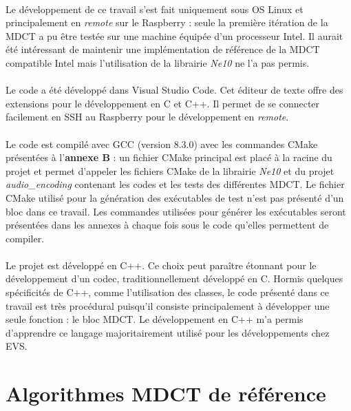 \documentclass{article}
\begin{document}
    \paragraph{}
    Le développement de ce travail s'est fait uniquement sous OS Linux et principalement en \emph{remote} sur le Raspberry : seule la première itération de la MDCT a pu être testée sur une machine équipée d'un processeur Intel. Il aurait été intéressant de maintenir une implémentation de référence de la MDCT compatible Intel mais l'utilisation de la librairie \emph{Ne10} ne l'a pas permis.

    \paragraph{}
    Le code a été développé dans Visual Studio Code. Cet éditeur de texte offre des extensions pour le développement en C et C++. Il permet de se connecter facilement en SSH au Raspberry pour le développement en \emph{remote}.

    \paragraph{}
    Le code est compilé avec GCC (version 8.3.0) avec les commandes CMake présentées à l'\textbf{annexe B} : un fichier CMake principal est placé à la racine du projet et permet d'appeler les fichiers CMake de la librairie \emph{Ne10} et du projet \emph{audio\_encoding} contenant les codes et les tests des différentes MDCT. Le fichier CMake utilisé pour la génération des exécutables de test n'est pas présenté d'un bloc dans ce travail. Les commandes utilisées pour générer les exécutables seront présentées dans les annexes à chaque fois sous le code qu'elles permettent de compiler.

    \paragraph{}
    Le projet est développé en C++. Ce choix peut paraître étonnant pour le développement d'un codec, traditionnellement développé en C. Hormis quelques spécificités de C++, comme l'utilisation des classes, le code présenté dans ce travail est très procédural puisqu'il consiste principalement à développer une seule fonction : le bloc MDCT. Le développement en C++ m'a permis d'apprendre ce langage majoritairement utilisé pour les développements chez EVS.



    \newpage
    \section{Algorithmes MDCT de référence}
\end{document}
